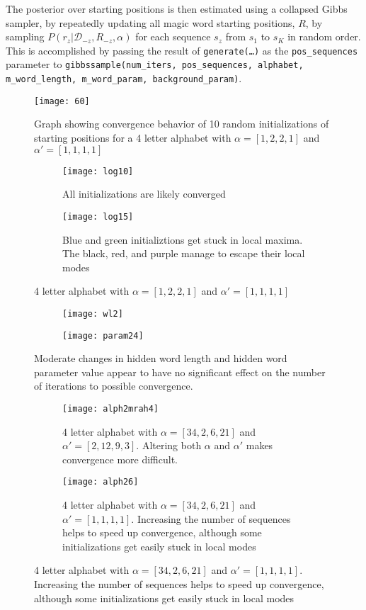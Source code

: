 \documentclass[a4paper,12pt]{article}
\begin{document}
The posterior over starting positions is then estimated using a collapsed Gibbs sampler,
by repeatedly updating all magic word starting positions, $R$, by sampling $P(r_z|\mathcal{D}_{-z},R_{-z},\alpha)$ for each sequence $s_z$ from $s_1$ to $s_K$ in random order.
This is accomplished by passing the result of \texttt{generate(\ldots)} as the \texttt{pos\_sequences} parameter to \texttt{gibbssample(num\_iters, pos\_sequences, alphabet, m\_word\_length, m\_word\_param, background\_param)}.
\begin{figure}[h]
	\centering
	\texttt{[image: 60]}
	\caption{Graph showing convergence behavior of 10 random initializations of starting positions for a 4 letter alphabet with $\alpha = [1,2,2,1]$ and $\alpha' = [1,1,1,1]$}
\end{figure}

\begin{figure}[h]
		\centering
		\begin{subfigure}[b]{0.8\textwidth}
				\centering
				\texttt{[image: log10]}
				\caption{All initializations are likely converged}
		\end{subfigure}
		\begin{subfigure}[b]{0.8\textwidth}
				\centering
				\texttt{[image: log15]}
				\caption{Blue and green initializtions get stuck in local maxima. The black, red, and purple manage to escape their local modes}
		\end{subfigure}
		\caption{4 letter alphabet with $\alpha = [1,2,2,1]$ and $\alpha' = [1,1,1,1]$}
\end{figure}

\begin{figure}[h]
	\begin{subfigure}[b]{0.8\textwidth}
		\centering
		\texttt{[image: wl2]}
	\end{subfigure}
	\begin{subfigure}[b]{0.8\textwidth}
		\centering
		\texttt{[image: param24]}
	\end{subfigure}
	\caption{Moderate changes in hidden word length and hidden word parameter value appear to have no significant effect on the number of iterations to possible convergence.}
\end{figure}


\begin{figure}[h]
	\begin{subfigure}[b]{0.8\textwidth}
		\centering
		\texttt{[image: alph2mrah4]}
		\caption{4 letter alphabet with $\alpha = [34,2,6,21]$ and $\alpha' = [2,12,9,3]$. Altering both $\alpha$ and $\alpha'$ makes convergence more difficult.}
	\end{subfigure}
	\begin{subfigure}[b]{0.8\textwidth}
		\centering
		\texttt{[image: alph26]}
		\caption{4 letter alphabet with $\alpha = [34,2,6,21]$ and $\alpha' = [1,1,1,1]$. Increasing the number of sequences helps to speed up convergence, although some initializations get easily stuck in local modes}
	\end{subfigure}
\end{figure}
\end{document}
